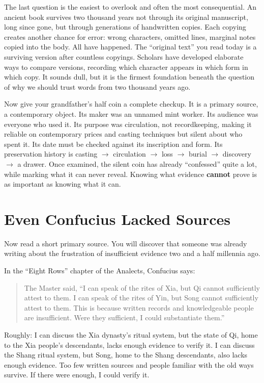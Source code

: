 The last question is the easiest to overlook and often the most consequential. An ancient book survives two thousand years not through its original manuscript, long since gone, but through generations of handwritten copies. Each copying creates another chance for error: wrong characters, omitted lines, marginal notes copied into the body. All have happened. The ``original text'' you read today is a surviving version after countless copyings. Scholars have developed elaborate ways to compare versions, recording which character appears in which form in which copy. It sounds dull, but it is the firmest foundation beneath the question of why we should trust words from two thousand years ago.

Now give your grandfather's half coin a complete checkup. It is a primary source, a contemporary object. Its maker was an unnamed mint worker. Its audience was everyone who used it. Its purpose was circulation, not recordkeeping, making it reliable on contemporary prices and casting techniques but silent about who spent it. Its date must be checked against its inscription and form. Its preservation history is casting $\rightarrow$ circulation $\rightarrow$ loss $\rightarrow$ burial $\rightarrow$ discovery $\rightarrow$ a drawer. Once examined, the silent coin has already ``confessed'' quite a lot, while marking what it can never reveal. Knowing what evidence \textbf{cannot} prove is as important as knowing what it can.

\section{Even Confucius Lacked Sources}
Now read a short primary source. You will discover that someone was already writing about the frustration of insufficient evidence two and a half millennia ago.

In the ``Eight Rows'' chapter of the Analects, Confucius says:

\begin{quote}
The Master said, ``I can speak of the rites of Xia, but Qi cannot sufficiently attest to them. I can speak of the rites of Yin, but Song cannot sufficiently attest to them. This is because written records and knowledgeable people are insufficient. Were they sufficient, I could substantiate them.''
\end{quote}
Roughly: I can discuss the Xia dynasty's ritual system, but the state of Qi, home to the Xia people's descendants, lacks enough evidence to verify it. I can discuss the Shang ritual system, but Song, home to the Shang descendants, also lacks enough evidence. Too few written sources and people familiar with the old ways survive. If there were enough, I could verify it.

